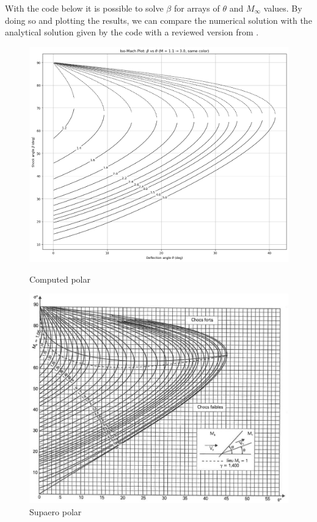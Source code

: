 With the code below it is possible to solve $\beta$ for arrays of \(\theta\) and \(M_\infty\) values. By doing so and plotting the results, we can compare the numerical solution with the analytical solution given by the code with a reviewed version from \cite{Tables de Détente ou de Choc by Supaero}. 
\begin{figure}[H]
    \centering
    \begin{minipage}[b]{0.45\linewidth}
        \centering
        \includegraphics[width=\linewidth]{ressources/figures/compute_polaire.png}
		\caption{Computed polar}
    \end{minipage}
    \begin{minipage}[b]{0.45\linewidth}
        \centering
        \includegraphics[width=\linewidth]{ressources/figures/supaero_polar.jpg}
		\caption{Supaero polar}
    \end{minipage}
    \label{fig:polar_comparison}
\end{figure}


